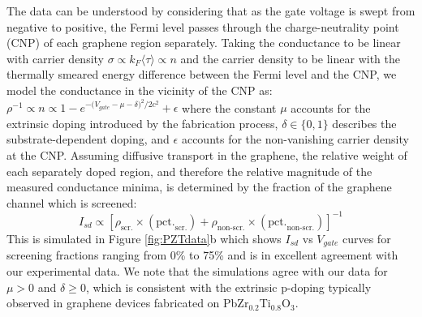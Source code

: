 \documentclass[edeposit,fullpage,draftthesis]{uiucthesis2009}
\begin{document}
        The data can be understood by considering that as the gate voltage is swept from negative to positive, the Fermi level passes through the charge-neutrality point (CNP) of each graphene region separately. Taking the conductance to be linear with carrier density\cite{Hwang2007} $\sigma \propto k_F \langle\tau\rangle \propto n$ and the carrier density to be linear with the thermally smeared energy difference between the Fermi level and the CNP\cite{CastroNeto2009}, we model the conductance in the vicinity of the CNP as: $\rho^{-1} \propto n \propto 1 - e^{{-(V_{gate}}-\mu-\delta)^2/2c^2} + \epsilon$ where the constant $\mu$ accounts for the extrinsic doping introduced by the fabrication process, $\delta \in \{0,1\}$ describes the substrate-dependent doping, and $\epsilon$ accounts for the non-vanishing carrier density at the CNP. Assuming diffusive transport in the graphene, the relative weight of each separately doped region, and therefore the relative magnitude of the measured conductance minima, is determined by the fraction of the graphene channel which is screened:
        \begin{equation}
            I_{sd} \propto \left[ \rho_\text{scr.} \times (\text{pct.}_\text{scr.}) + \rho_\text{non-scr.} \times (\text{pct.}_\text{non-scr.}) \right]^{-1}
        \end{equation}
        This is simulated in Figure \ref{fig:PZTdata}b which shows $I_{sd}$ vs $V_{gate}$ curves for screening fractions ranging from 0\% to 75\% and is in excellent agreement with our experimental data. We note that the simulations agree with our data for $\mu > 0$ and $\delta \geq 0$, which is consistent with the extrinsic p-doping typically observed in graphene devices fabricated on PbZr$_{0.2}$Ti$_{0.8}$O$_3$\cite{Baeumer2013}.
\end{document}
